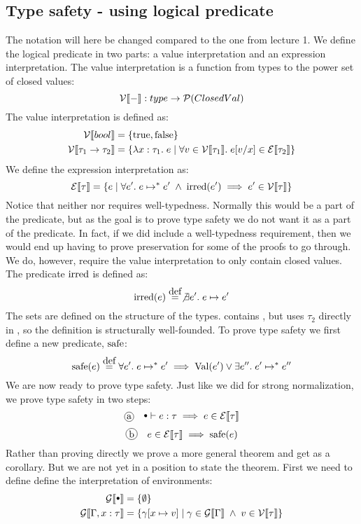 \subsection*{Type safety - using logical predicate}
The notation will here be changed compared to the one from lecture 1. We define the logical predicate in two parts: a value interpretation and an expression interpretation. The value interpretation is a function from types to the power set of closed values:
\[
  \mathcal{V}\llbracket - \rrbracket :  type \rightarrow \mathcal{P}(ClosedVal)
\]
The value interpretation is defined as:
\begin{align*}
  \mathcal{V}\llbracket bool \rrbracket & = \{ \text{true}, \text{false} \}\\
  \mathcal{V}\llbracket  \tau_1 \rightarrow \tau_2 \rrbracket & = \{\lambda x : \tau_1 . \; e \; | \; \forall v \in \mathcal{V}\llbracket \tau_1 \rrbracket.\; e [v/x] \in \mathcal{E}\llbracket \tau_2 \rrbracket\}
\end{align*}
We define the expression interpretation as:
\[
  \mathcal{E}\llbracket \tau \rrbracket = \{e \; | \; \forall e'. \; e \mapsto^{*} e' \; \wedge \; \operatorname{irred}(e') \implies e' \in \mathcal{V}\llbracket \tau \rrbracket \}
\]
Notice that neither \vpred{\tau} nor \epred{\tau} requires well-typedness. Normally this would be a part of the predicate, but as the goal is to prove type safety we do not want it as a part of the predicate. In fact, if we did include a well-typedness requirement, then we would end up having to prove preservation for some of the proofs to go through. We do, however, require the value interpretation to only contain closed values. The predicate $\operatorname{irred}$ is defined as:
\[
  \irred(e) \eqdef \not\exists e'. \; e \evalto e'
\]
The sets are defined on the structure of the types.  contains , but  uses $\tau_2$ directly in , so the definition is structurally well-founded. To prove type safety we first define a new predicate, $\operatorname{safe}$:
\[
  \safe(e) \eqdef \forall e' . \; e \evaltos e' \implies \val(e') \vee \exists e
''. \; e' \evaltos e''
\]
We are now ready to prove type safety. Just like we did for strong normalization, we prove type safety in two steps:
\[
  \circled{a} \quad \mtenv \vdash e : \tau \implies e \in \epred{\tau}
\]
\[
  \circled{b} \quad e \in \epred{\tau} \implies \safe(e)
\]
Rather than proving  directly we prove a more general theorem and get  as a corollary. But we are not yet in a position to state the theorem. First we need to define define the interpretation of environments:
\begin{align*}
  \gpred{\mtenv} & = \{ \emptyset \} \\
  \gpred{\Gamma,x:\tau} & = \{\gamma[x \mapsto v] \vbar 
    \gamma \in \gpred{\Gamma} \pand 
    v \in \vpred{\tau}\}
\end{align*}
